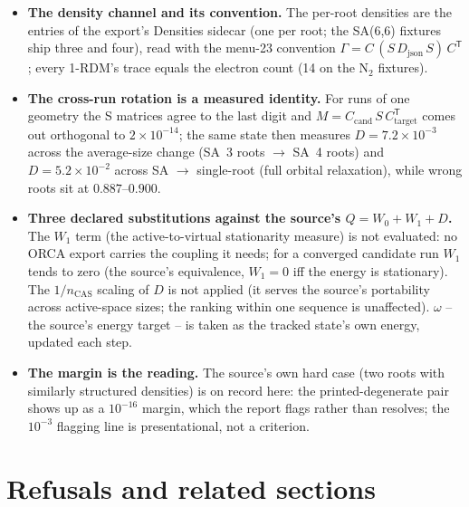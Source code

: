 \begin{readbox}
\begin{itemize}
  \item \textbf{The density channel and its convention.}  The per-root
    densities are the  entries of the
    export's Densities sidecar (one per root; the SA(6,6) fixtures ship
    three and four), read with the menu-23 convention $\Gamma = C\,(S\,
    D_{\mathrm{json}}\,S)\,C^{\mathsf T}$; every 1-RDM's trace equals the
    electron count (14 on the N$_2$ fixtures).
  \item \textbf{The cross-run rotation is a measured identity.}  For runs
    of one geometry the S matrices agree to the last digit and
    $M = C_{\mathrm{cand}}\,S\,C_{\mathrm{target}}^{\mathsf T}$ comes out
    orthogonal to $2\times10^{-14}$; the same state then measures
    $D = 7.2\times10^{-3}$ across the average-size change (SA~3 roots
    $\to$ SA~4 roots) and $D = 5.2\times10^{-2}$ across SA $\to$
    single-root (full orbital relaxation), while wrong roots sit at
    $0.887$--$0.900$.
  \item \textbf{Three declared substitutions against the source's
    $Q = W_0 + W_1 + D$.}  The $W_1$ term (the active-to-virtual
    stationarity measure) is not evaluated: no ORCA export carries the
    coupling it needs; for a converged candidate run $W_1$ tends to zero
    (the source's equivalence, $W_1 = 0$ iff the energy is stationary).
    The $1/n_{\mathrm{CAS}}$ scaling of $D$ is not applied (it serves the
    source's portability across active-space sizes; the ranking within
    one sequence is unaffected).  $\omega$ -- the source's energy target
    -- is taken as the tracked state's own energy, updated each step.
  \item \textbf{The margin is the reading.}  The source's own hard case
    (two roots with similarly structured densities) is on record here:
    the printed-degenerate pair shows up as a $10^{-16}$ margin, which
    the report flags rather than resolves; the $10^{-3}$ flagging line is
    presentational, not a criterion.
\end{itemize}
\end{readbox}

\section{Refusals and related sections}

